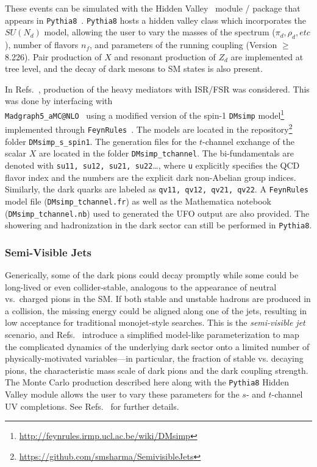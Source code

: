 
These events can be simulated with the Hidden Valley~\cite{Carloni:2010tw} module / package that appears in \texttt{Pythia8}~\cite{Sjostrand:2014zea}. \texttt{Pythia8} hosts a hidden valley class which incorporates the $SU(N_{d})$ model, allowing the user to vary the masses of the spectrum ($\pi_{d}, \rho_{d}, etc$), number of flavors $n_{f}$, and parameters of the running coupling (Version $\geq$ 8.226). Pair production of $X$ and resonant production of $Z_d$ are implemented at tree level, and the decay of dark mesons to SM states is also present.

In Refs.~\cite{Cohen:2017pzm,Linthorne:2018abc}, production of the heavy mediators with ISR/FSR was considered. This was done by interfacing with\\
 \texttt{Madgraph5\_aMC@NLO}~\cite{Alwall:2014hca} using a modified version of the spin-1 \texttt{DMsimp} model\footnote{\url{http://feynrules.irmp.ucl.ac.be/wiki/DMsimp}} implemented through \texttt{FeynRules}~\cite{Alloul:2013bka}. The models are located in the repository\footnote{\url{https://github.com/smsharma/SemivisibleJets}} folder \texttt{DMsimp\_s\_spin1}. The generation files for the $t$-channel exchange of the scalar $X$ are located in the folder \texttt{DMsimp\_tchannel}. The bi-fundamentals are denoted with \texttt{su11, su12, su21, su22}\ldots, where \texttt{u} explicitly specifies the QCD flavor index and the numbers are the explicit dark non-Abelian group indices. Similarly, the dark quarks are labeled as \texttt{qv11, qv12, qv21, qv22}. A \texttt{FeynRules} model file (\texttt{DMsimp\_tchannel.fr}) as well as the Mathematica notebook (\texttt{DMsimp\_tchannel.nb}) used to generated the UFO output are also provided. The showering and hadronization in the dark sector can still be performed in \texttt{Pythia8}.


\subsubsection{Semi-Visible Jets}

Generically, some of the dark pions could decay promptly while some could be long-lived or even collider-stable, analogous to the appearance of neutral vs.~charged pions in the SM. If both stable and unstable hadrons are produced in a collision, the missing energy could be aligned along one of the jets, resulting in low acceptance for traditional monojet-style searches. This is the {\em semi-visible jet} scenario, and Refs.~\cite{Cohen:2015toa,Cohen:2017pzm} introduce a simplified model-like parameterization to map the complicated dynamics of the underlying dark sector onto a limited number of physically-motivated variables---in particular, the fraction of stable vs. decaying pions, the characteristic mass scale of dark pions and the dark coupling strength. The Monte Carlo production described here along with the \texttt{Pythia8} Hidden Valley module allows the user to vary these parameters for the $s$- and $t$-channel UV completions. See Refs.~\cite{Cohen:2015toa,Cohen:2017pzm} for further details.

